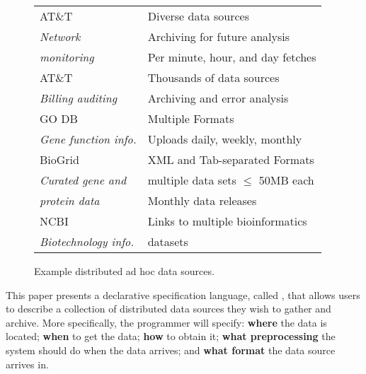 \begin{figure}[t]
\begin{center}
\begin{tabular}{|l|l|}
{\small AT\&T \darkstar{}                   } & {\small  Diverse data sources} \\
{\small {\em  Network}       } & {\small  Archiving for future analysis } \\
{\small {\em  monitoring}	} & {\small  Per minute, hour, and day fetches} \\\hline
{\small AT\&T \ningaui{}                    } & {\small  Thousands of data sources} \\
{\small {\em  Billing auditing}        } & {\small  Archiving and error analysis} \\\hline
{\small GO DB~\cite{geneontology} } & {\small  Multiple Formats } \\
{\small {\em  Gene function info.}     } & {\small  Uploads daily, weekly, monthly } \\\hline
{\small BioGrid~\cite{biogrid}        } & {\small  XML and Tab-separated Formats } \\
{\small {\em  Curated gene and}  } & {\small  multiple data sets $\leq$ 50MB each } \\
{\small {\em  protein data}                              } & {\small  Monthly data releases } \\\hline
{\small NCBI~\cite{ncbi} } & {\small  Links to multiple bioinformatics  } \\
{\small {\em  Biotechnology info.} } & {\small  datasets} \\
\hline
\end{tabular}
\end{center}
\shrink 
\caption{Example distributed ad hoc data sources.}
\shrink 
\label{fig:exampledata}
\end{figure}

This paper presents a declarative specification language, called
\padsd{}, that allows users to
describe a collection of distributed data sources they wish to
gather and archive.  More specifically, the \padsd{} programmer will
specify: {\bf where} the data is located; {\bf when} to get the data;      
{\bf how} to obtain it; 
{\bf what preprocessing} the system should do when the data arrives; and 
{\bf what format} the data source arrives in.

